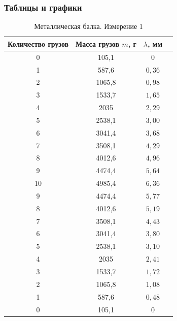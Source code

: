 \documentclass{article}
\begin{document}
\newpage
\subsubsection*{Таблицы и графики}

\begin{table}[!h]
    \centering
    \begin{tabular}{|c|c|c|c|}
        \hline
         Количество грузов & Масса грузов $m$, г & $\lambda$, мм  \\
         \hline
        0  & 105,1  & 0                  \\
        1  & 587,6  & $0,36$  \\
        2  & 1065,8 & $0,98$  \\
        3  & 1533,7 & $1,65$\\
        4  & 2035   & $2,29$ \\
        5  & 2538,1 & $3,00$ \\
        6  & 3041,4 & $3,68$ \\
        7  & 3508,1 & $4,29$ \\
        8  & 4012,6 & $4,96$ \\
        9  & 4474,4 & $5,64$ \\
        10 & 4985,4 & $6,36$ \\
        9  & 4474,4 & $5,77$ \\
        8  & 4012,6 & $5,19$ \\
        7  & 3508,1 & $4,43$ \\
        6  & 3041,4 & $3,80$ \\
        5  & 2538,1 & $3,10$ \\
        4  & 2035   & $2,41$ \\
        3  & 1533,7 & $1,72$ \\
        2  & 1065,8 & $1,08$ \\
        1  & 587,6  & $0,48$  \\
        0  & 105,1  & 0                 \\
        \hline
    \end{tabular}
    \caption{Металлическая балка. Измерение 1}
\end{table}
\end{document}
